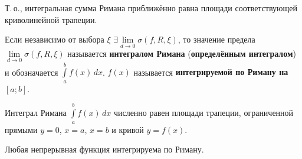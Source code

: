 Т.\,о., интегральная сумма Римана приближённо равна площади соответствующей криволинейной трапеции.

  Если независимо от выбора $\xi$ $\exists \lim\limits_{d \to 0} \sigma(f, R, \xi)$, то значение предела~$\lim\limits_{d \to 0} \sigma(f, R, \xi)$ называется \textbf{интегралом Римана} (\textbf{определённым интегралом}) и обозначается $\int\limits_a^b f(x)\,dx$.
$f(x)$ называется \textbf{интегрируемой по Риману на~$[a; b]$}.

Интеграл Римана $\int\limits_a^b f(x)\,dx$ численно равен площади трапеции, ограниченной прямыми $y = 0$, $x = a$, $x = b$ и кривой $y = f(x)$.

\begin{theorem}
Любая непрерывная функция интегрируема по Риману.
\end{theorem}

